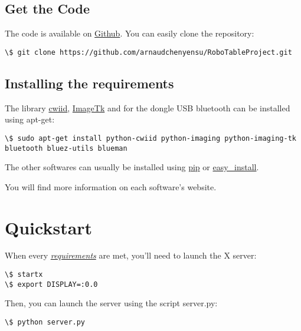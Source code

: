 \documentclass[letterpaper,10pt,english]{sphinxmanual}
\begin{document}
\subsection{Get the Code}
\label{user/install:get-the-code}
The code is available on \href{https://github.com/arnaudchenyensu/RoboTableProject}{Github}. You can easily clone the repository:

\begin{Verbatim}[commandchars=\\\{\}]
\$ git clone https://github.com/arnaudchenyensu/RoboTableProject.git
\end{Verbatim}


\subsection{Installing the requirements}
\label{user/install:installing-the-requirements}\label{user/install:installrequirements}
The library \href{http://goo.gl/RYfUPk}{cwiid}, \href{http://goo.gl/XlP9g9}{ImageTk} and for the dongle USB bluetooth can be installed using apt-get:

\begin{Verbatim}[commandchars=\\\{\}]
\$ sudo apt-get install python-cwiid python-imaging python-imaging-tk bluetooth bluez-utils blueman
\end{Verbatim}

The other softwares can usually be installed using \href{https://pypi.python.org/pypi/pip}{pip} or \href{https://pypi.python.org/pypi/setuptools}{easy\_install}.

You will find more information on each software's website.


\section{Quickstart}
\label{user/quickstart::doc}\label{user/quickstart:quickstart}
When every {\hyperref[user/intro:requirements]{\emph{requirements}}} are met, you'll need to launch the X server:

\begin{Verbatim}[commandchars=\\\{\}]
\$ startx
\$ export DISPLAY=:0.0
\end{Verbatim}

Then, you can launch the server using the script server.py:

\begin{Verbatim}[commandchars=\\\{\}]
\$ python server.py
\end{Verbatim}
\end{document}
